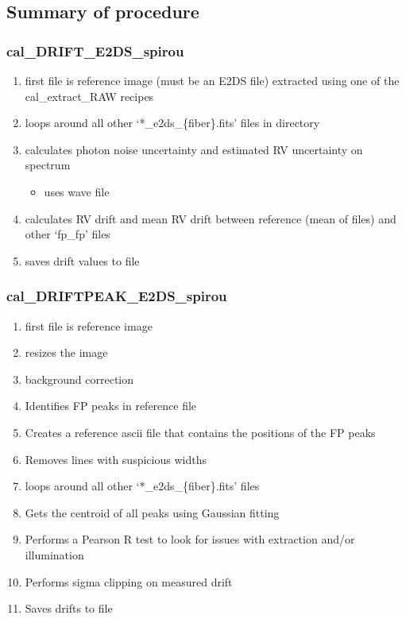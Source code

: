 \subsection{Summary of procedure}

\subsubsection{cal\_DRIFT\_E2DS\_spirou}

\begin{enumerate}
	\item first file is reference image (must be an E2DS file) extracted using one of the cal\_extract\_RAW recipes
	\item loops around all other `*\_e2ds\_\{fiber\}.fits' files in directory
	\item calculates photon noise uncertainty and estimated RV uncertainty on spectrum
	\begin{itemize}
		\item uses wave file
	\end{itemize}
	\item calculates RV drift and mean RV drift between reference (mean of files) and other `fp\_fp' files
	\item saves drift values to file
\end{enumerate}

\subsubsection{cal\_DRIFTPEAK\_E2DS\_spirou}

\begin{enumerate}
	\item first file is reference image
	\item resizes the image
	\item background correction
	\item Identifies FP peaks in reference file
	\item Creates a reference ascii file that contains the positions of the FP peaks
	\item Removes lines with suspicious widths
	\item loops around all other `*\_e2ds\_\{fiber\}.fits' files
	\item Gets the centroid of all peaks using Gaussian fitting
	\item Performs a Pearson R test to look for issues with extraction and/or illumination
	\item Performs sigma clipping on measured drift
	\item Saves drifts to file
\end{enumerate}

